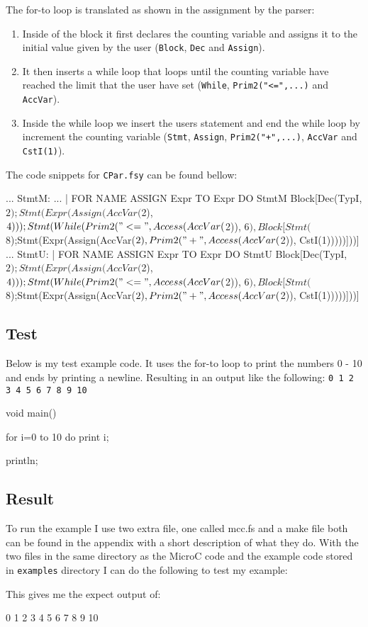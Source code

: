 The for-to loop is translated as shown in the assignment by the parser: 
\begin{enumerate}
    \item Inside of the block it first declares the counting variable and
        assigns it to the initial value given by the user (\texttt{Block},
        \texttt{Dec} and \texttt{Assign}).
    \item It then inserts a while loop that loops until the counting variable
        have reached the limit that the user have set (\texttt{While},
        \texttt{Prim2("<=",...)} and \texttt{AccVar}).
    \item Inside the while loop we insert the users statement and end the while
        loop by increment the counting variable (\texttt{Stmt}, \texttt{Assign},
        \texttt{Prim2("+",...)}, \texttt{AccVar} and \texttt{CstI(1)}).
\end{enumerate}
The code snippets for \texttt{CPar.fsy} can be found bellow:
\begin{fs}
...
StmtM:
...
  | FOR NAME ASSIGN Expr TO Expr DO StmtM { Block[Dec(TypI, $2); Stmt(Expr(Assign(AccVar($2), $4))); Stmt(While(Prim2("<=", Access(AccVar($2)), $6), Block[Stmt($8);Stmt(Expr(Assign(AccVar($2), Prim2("+", Access(AccVar($2)), CstI(1)))))]))] }
...
StmtU:
  | FOR NAME ASSIGN Expr TO Expr DO StmtU { Block[Dec(TypI, $2); Stmt(Expr(Assign(AccVar($2), $4))); Stmt(While(Prim2("<=", Access(AccVar($2)), $6), Block[Stmt($8);Stmt(Expr(Assign(AccVar($2), Prim2("+", Access(AccVar($2)), CstI(1)))))]))] }
\end{fs}
\subsection{Test}
Below is my test example code. It uses the for-to loop to print the numbers 0 - 10
and ends by printing a newline. Resulting in an output like the following:
\texttt{0 1 2 3 4 5 6 7 8 9 10}
\begin{ccode}
void main() {
  for i=0 to 10 do 
    print i;

  println;
}
\end{ccode}
\subsection{Result}
To run the example I use two extra file, one called mcc.fs and a make file both can
be found in the appendix with a short description of what they do. With the two
files in the same directory as the MicroC code and the example code stored in
\texttt{examples} directory I can do the following to test my example:
\begin{bashcode}
\end{bashcode}
This gives me the expect output of:
\begin{bashcode}
0 1 2 3 4 5 6 7 8 9 10

\end{bashcode}

